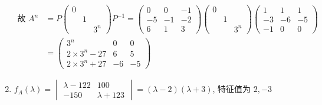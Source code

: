 \begin{enumerate}
                   \(\begin{aligned}
                       \text{故 } A^{n} & = P\begin{pmatrix}
                                                0 &   &       \\
                                                  & 1 &       \\
                                                  &   & 3^{n}
                                            \end{pmatrix}P^{-1} = \begin{pmatrix}
                                                                      0  & 0  & -1 \\
                                                                      -5 & -1 & -2 \\
                                                                      6  & 1  & 3
                                                                  \end{pmatrix}\begin{pmatrix}
                                                                                   0 &   &       \\
                                                                                     & 1 &       \\
                                                                                     &   & 3^{n}
                                                                               \end{pmatrix}\begin{pmatrix}
                                                                                                1  & 1  & 1  \\
                                                                                                -3 & -6 & -5 \\
                                                                                                -1 & 0  & 0
                                                                                            \end{pmatrix} \\
                                       & = \begin{pmatrix}
                                               3^{n}           & 0  & 0  \\
                                               2\times3^{n}-27 & 6  & 5  \\
                                               2\times3^{n}+27 & -6 & -5
                                           \end{pmatrix}
                   \end{aligned} \)
             \item %
                   \( f_{A}(\lambda) = \begin{vmatrix}
                       \lambda - 122 & 100           \\
                       -150          & \lambda + 123
                   \end{vmatrix} = (\lambda - 2)(\lambda + 3) \), 特征值为 \( 2, -3 \)


\end{enumerate}
